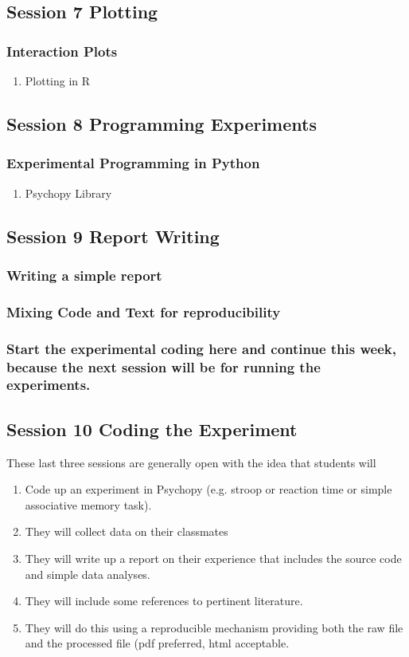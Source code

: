 \documentclass{article}
\begin{document}
\subsection{Session 7 Plotting}
\label{sec:orgdc0b9a1}
\subsubsection{Interaction Plots}
\label{sec:orge654130}
\begin{enumerate}
\item Plotting in R
\label{sec:org0e6af7e}
\end{enumerate}
\subsection{Session 8 Programming Experiments}
\label{sec:org8c32209}
\subsubsection{Experimental Programming in Python}
\label{sec:orgda8000e}
\begin{enumerate}
\item Psychopy Library
\label{sec:org0f9fa68}
\end{enumerate}
\subsection{Session 9 Report Writing}
\label{sec:org54ce56e}
\subsubsection{Writing a simple report}
\label{sec:orge6781c4}
\subsubsection{Mixing Code and Text for reproducibility}
\label{sec:orgb16b8f2}
\subsubsection{Start the experimental coding here and continue this week, because the next session will be for running the experiments.}
\label{sec:orga155476}
\subsection{Session 10 Coding the Experiment}
\label{sec:orgf3784dd}
These last three sessions are generally open with the idea that students will 
\begin{enumerate}
\item Code up an experiment in Psychopy (e.g. stroop or reaction time or simple associative memory task).
\item They will collect data on their classmates
\item They will write up a report on their experience that includes the source code and simple data analyses.
\item They will include some references to pertinent literature.
\item They will do this using a reproducible mechanism providing both the raw file and the processed file (pdf preferred, html acceptable.
\end{enumerate}
\end{document}
